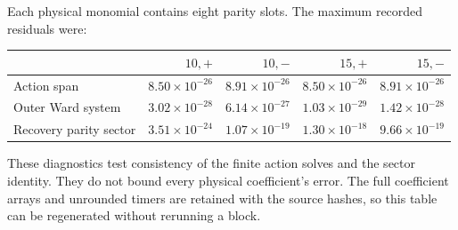Each physical monomial contains eight parity slots. The maximum
recorded residuals were:
\begin{center}
\begin{tabular}{lrrrr}
\toprule
& $10,+$ & $10,-$ & $15,+$ & $15,-$\\
\midrule
Action span & $8.50\times10^{-26}$ & $8.91\times10^{-26}$ & $8.50\times10^{-26}$ & $8.91\times10^{-26}$\\
Outer Ward system & $3.02\times10^{-28}$ & $6.14\times10^{-27}$ & $1.03\times10^{-29}$ & $1.42\times10^{-28}$\\
Recovery parity sector & $3.51\times10^{-24}$ & $1.07\times10^{-19}$ & $1.30\times10^{-18}$ & $9.66\times10^{-19}$\\
\bottomrule
\end{tabular}
\end{center}
These diagnostics test consistency of the finite action solves and
the sector identity. They do not bound every physical coefficient's error.
The full coefficient arrays and unrounded timers are retained with
the source hashes, so this table can be regenerated without rerunning a block.
